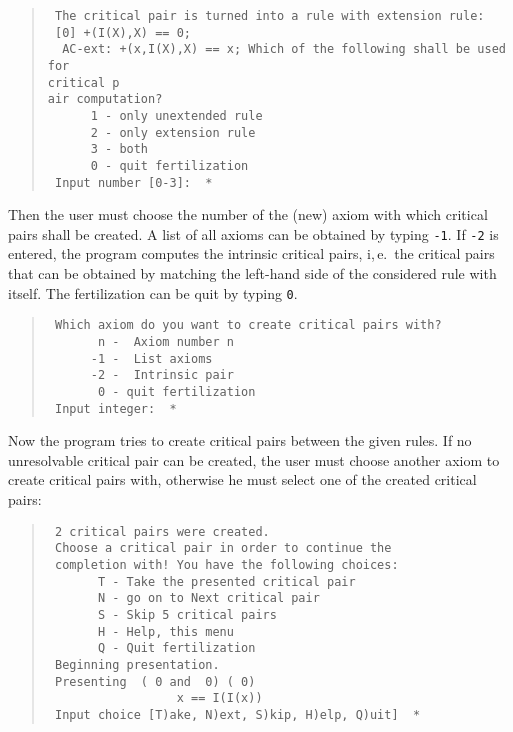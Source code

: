 \begin{quote}
\begin{verbatim}
 The critical pair is turned into a rule with extension rule:
 [0] +(I(X),X) == 0;
  AC-ext: +(x,I(X),X) == x; Which of the following shall be used for
critical p
air computation?
      1 - only unextended rule
      2 - only extension rule
      3 - both
      0 - quit fertilization
 Input number [0-3]:  *
\end{verbatim}
\end{quote}

Then the user must choose the number of the (new) axiom with which critical 
pairs shall be created.
A list of all axioms can be obtained by typing {\tt -1}.
If {\tt -2} is entered, the program computes the intrinsic critical
pairs, i,\,e.~the critical pairs that can be obtained by matching
the left-hand side of the considered rule with itself.
The fertilization can be quit by typing {\tt 0}.
\begin{quote}
\begin{verbatim}
 Which axiom do you want to create critical pairs with?
       n -  Axiom number n
      -1 -  List axioms
      -2 -  Intrinsic pair
       0 - quit fertilization
 Input integer:  *
\end{verbatim}
\end{quote}

Now the program tries to create critical pairs between the given
rules.  If no unresolvable critical pair can be created, the user must
choose another axiom to create critical pairs with, otherwise he must
select one of the created critical pairs:

\begin{quote}
\begin{verbatim}
 2 critical pairs were created.
 Choose a critical pair in order to continue the
 completion with! You have the following choices: 
       T - Take the presented critical pair
       N - go on to Next critical pair
       S - Skip 5 critical pairs
       H - Help, this menu
       Q - Quit fertilization
 Beginning presentation.
 Presenting  ( 0 and  0) ( 0)
                  x == I(I(x))
 Input choice [T)ake, N)ext, S)kip, H)elp, Q)uit]  *
\end{verbatim}
\end{quote}

